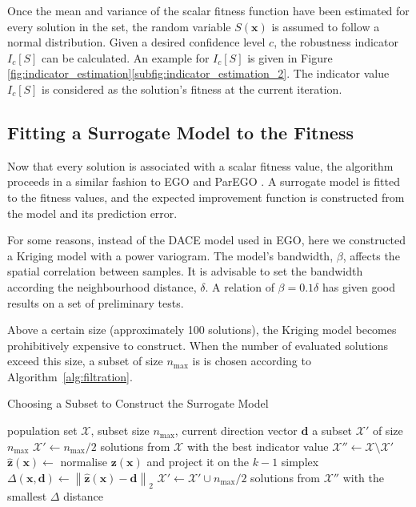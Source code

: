 \documentclass[10pt]{llncs}
\newcommand{\brr}[1]{{\left({#1}\right)}} %
\newcommand{\norm}[2]{\left\|{#1}\right\|_{#2}} %
\newcommand{\Ic}[1]{I_c\!\left[{#1}\right]} %
\newcommand{\vx}{\mathbf{x}} %
\newcommand{\vz}{\mathbf{z}} %
\newcommand{\vd}{\mathbf{d}} %
\newcommand{\XSet}{\mathcal{X}} %
\begin{document}
Once the mean and variance of the scalar fitness function have been estimated for every solution in the set, the random variable $S\brr{\vx}$ is assumed to follow a normal distribution.
Given a desired confidence level $c$, the robustness indicator $\Ic{S}$ can be calculated.
An example for $\Ic{S}$ is given in Figure \ref{fig:indicator_estimation}\ref{subfig:indicator_estimation_2}.
The indicator value $\Ic{S}$ is considered as the solution's fitness at the current iteration.

\subsection{Fitting a Surrogate Model to the Fitness}
\label{subsec:Kriging}
Now that every solution is associated with a scalar fitness value, the algorithm proceeds in a similar fashion to EGO and ParEGO \cite{Jones1998Efficient,knowles2005multiobjective}.
A surrogate model is fitted to the fitness values, and the expected improvement function is constructed from the model and its prediction error.

For some  reasons, instead of the DACE model used in EGO, here we constructed a Kriging model with a power variogram.
The model's bandwidth, $\beta$, affects the spatial correlation between samples.
It is advisable to set the bandwidth according the neighbourhood distance, $\delta$.
A relation of $\beta=0.1\delta$ has given good results on a set of preliminary tests.

Above a certain size (approximately 100 solutions), the Kriging model becomes prohibitively expensive to construct.
When the number of evaluated solutions exceed this size, a subset of size $n_\text{max}$ is is chosen according to Algorithm~\ref{alg:filtration}.

\begin{algorithm}
\caption{Choosing a Subset to Construct the Surrogate Model}
\label{alg:filtration}
\begin{algorithmic}[1]
	\Require population set $\XSet$, subset size $n_\text{max}$, current direction vector $\vd$
	\Ensure a subset $\XSet'$ of size $n_\text{max}$
	\State $\XSet' \leftarrow n_\text{max}/2$ solutions from $\XSet$ with the best indicator value
	\State $\XSet'' \leftarrow \XSet \setminus \XSet'$
	\ForAll{$\vx \in \XSet''$}
		\State $\hat{\vz}\brr{\vx} \leftarrow$ normalise $\vz\brr{\vx}$ and project it on the $k-1$ simplex
		\State $\Delta\brr{\vx, \vd} \leftarrow \norm{\hat{\vz}\brr{\vx} - \vd}{2}$
	\EndFor
	\State $\XSet' \leftarrow \XSet' \cup n_\text{max}/2$ solutions from $\XSet''$ with the smallest $\Delta$ distance
\end{algorithmic}
\end{algorithm}
\end{document}
